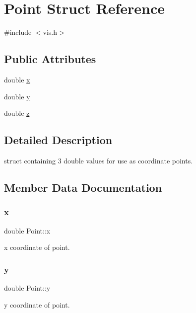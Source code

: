 \hypertarget{struct_point}{}\section{Point Struct Reference}
\label{struct_point}


{\ttfamily \#include $<$vis.\+h$>$}

\subsection*{Public Attributes}
\begin{DoxyCompactItemize}
\item 
double \mbox{\hyperlink{struct_point_ab99c56589bc8ad5fa5071387110a5bc7}{x}}
\item 
double \mbox{\hyperlink{struct_point_afa38be143ae800e6ad69ce8ed4df62d8}{y}}
\item 
double \mbox{\hyperlink{struct_point_a05ba3b1dfcb19430582ae953cbbfbded}{z}}
\end{DoxyCompactItemize}


\subsection{Detailed Description}
struct containing 3 double values for use as coordinate points. 

\subsection{Member Data Documentation}
\mbox{\label{struct_point_ab99c56589bc8ad5fa5071387110a5bc7}} 
\subsubsection{\texorpdfstring{x}{x}}
{\footnotesize\ttfamily double Point\+::x}

x coordinate of point. \mbox{\label{struct_point_afa38be143ae800e6ad69ce8ed4df62d8}} 
\subsubsection{\texorpdfstring{y}{y}}
{\footnotesize\ttfamily double Point\+::y}

y coordinate of point. \mbox{\label{struct_point_a05ba3b1dfcb19430582ae953cbbfbded}} 
